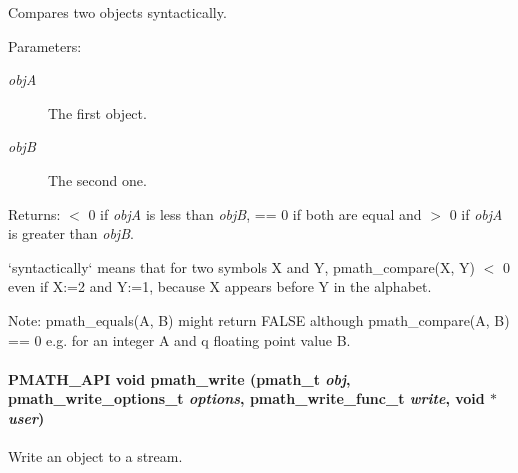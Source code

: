 Compares two objects syntactically. 

\begin{Desc}
\item[Parameters:]
\begin{description}
\item[{\em objA}]The first object. \item[{\em objB}]The second one. \end{description}
\end{Desc}
\begin{Desc}
\item[Returns:]$<$ 0 if {\em objA\/} is less than {\em objB\/}, == 0 if both are equal and $>$ 0 if {\em objA\/} is greater than {\em objB\/}.\end{Desc}
`syntactically` means that for two symbols X and Y, pmath\_\-compare(X, Y) $<$ 0 even if X:=2 and Y:=1, because X appears before Y in the alphabet.

\begin{Desc}
\item[Note:]pmath\_\-equals(A, B) might return FALSE although pmath\_\-compare(A, B) == 0 e.g. for an integer A and q floating point value B. \end{Desc}
\hypertarget{group__objects_g9f909b9eb04317260ee8630d10e5a7c6}{
\paragraph[{pmath\_\-write}]{\setlength{\rightskip}{0pt plus 5cm}PMATH\_\-API void pmath\_\-write ({\bf pmath\_\-t} {\em obj}, \/  {\bf pmath\_\-write\_\-options\_\-t} {\em options}, \/  {\bf pmath\_\-write\_\-func\_\-t} {\em write}, \/  void $\ast$ {\em user})}\hfill}
\label{group__objects_g9f909b9eb04317260ee8630d10e5a7c6}


Write an object to a stream. 

